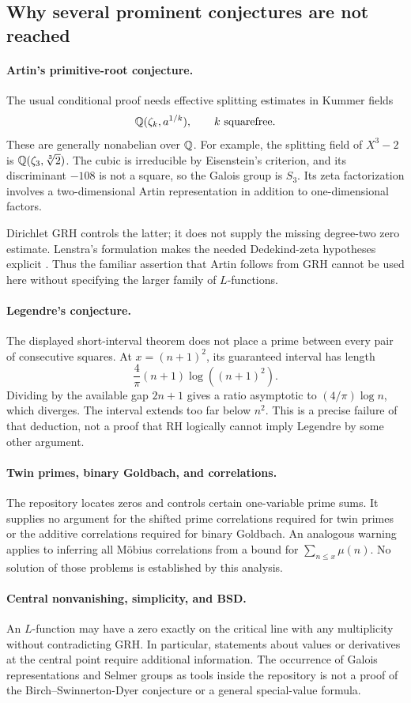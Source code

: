 \subsection{Why several prominent conjectures are not reached}

\paragraph{Artin's primitive-root conjecture.}
The usual conditional proof needs effective splitting estimates in Kummer fields
\[
\mathbb{Q}(\zeta_k,a^{1/k}),\qquad k\text{ squarefree}.
\]
These are generally nonabelian over \(\mathbb{Q}\). For example, the splitting field of \(X^3-2\) is \(\mathbb{Q}(\zeta_3,\sqrt[3]2)\). The cubic is irreducible by Eisenstein's criterion, and its discriminant \(-108\) is not a square, so the Galois group is \(S_3\). Its zeta factorization involves a two-dimensional Artin representation in addition to one-dimensional factors.

Dirichlet GRH controls the latter; it does not supply the missing degree-two zero estimate. Lenstra's formulation makes the needed Dedekind-zeta hypotheses explicit \cite{lenstra}. Thus the familiar assertion that Artin follows from GRH cannot be used here without specifying the larger family of \(L\)-functions.

\paragraph{Legendre's conjecture.}
The displayed short-interval theorem does not place a prime between every pair of consecutive squares. At \(x=(n+1)^2\), its guaranteed interval has length
\[
\frac4\pi(n+1)\log((n+1)^2).
\]
Dividing by the available gap \(2n+1\) gives a ratio asymptotic to \((4/\pi)\log n\), which diverges. The interval extends too far below \(n^2\). This is a precise failure of that deduction, not a proof that RH logically cannot imply Legendre by some other argument.

\paragraph{Twin primes, binary Goldbach, and correlations.}
The repository locates zeros and controls certain one-variable prime sums. It supplies no argument for the shifted prime correlations required for twin primes or the additive correlations required for binary Goldbach. An analogous warning applies to inferring all M\"obius correlations from a bound for \(\sum_{n\le x}\mu(n)\). No solution of those problems is established by this analysis.

\paragraph{Central nonvanishing, simplicity, and BSD.}
An \(L\)-function may have a zero exactly on the critical line with any multiplicity without contradicting GRH. In particular, statements about values or derivatives at the central point require additional information. The occurrence of Galois representations and Selmer groups as tools inside the repository is not a proof of the Birch--Swinnerton-Dyer conjecture or a general special-value formula.
